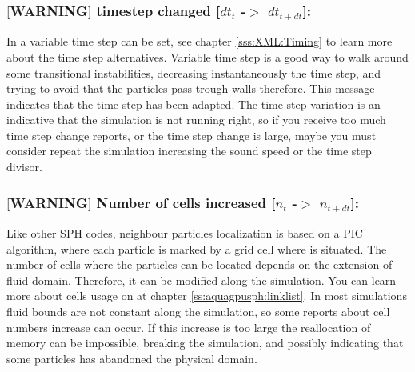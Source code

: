 \subsubsection{$[$WARNING$]$ timestep changed [$dt_t$ -$>$ $dt_{t+dt}$]:}
%
In \NAME a variable time step can be set, see chapter \ref{sss:XML:Timing} to learn more
about the time step alternatives. Variable time step is a good way to walk around
some transitional instabilities, decreasing instantaneously the time step, and
trying to avoid that the particles pass trough walls therefore.\rc
This message indicates that the time step has been adapted. The time step variation
is an indicative that the simulation is not running right, so if you receive
too much time step change reports, or the time step change is large, maybe you
must consider repeat the simulation increasing the sound speed or the time step
divisor.
%
\subsubsection{$[$WARNING$]$ Number of cells increased [$n_t$ -$>$ $n_{t+dt}$]:}
%
Like other SPH codes, \NAME neighbour particles localization is based on a
PIC algorithm, where each particle is marked by a grid cell where is situated. The
number of cells where the particles can be located depends on the extension of
fluid domain. Therefore, it can be modified along the simulation. You can learn more about
cells usage on \NAME at chapter \ref{ss:aquagpusph:linklist}.\rc
In most simulations fluid bounds are not constant along the simulation, so some
reports about cell numbers increase can occur. If this increase is too large the reallocation of
memory can be impossible, breaking the simulation, and possibly indicating that some
particles has abandoned the physical domain.
%
